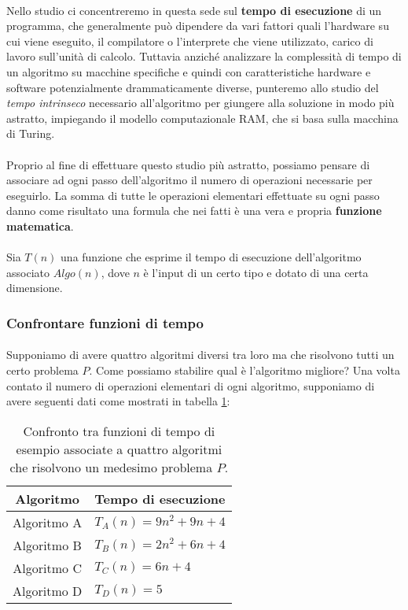 \documentclass[11pt,a4paper,oneside]{article}
\begin{document}
\paragraph*{} Nello studio ci concentreremo in questa sede sul \textbf{tempo di esecuzione} di un programma, che generalmente può dipendere da vari fattori quali l'hardware su cui viene eseguito, il compilatore o l'interprete che viene utilizzato, carico di lavoro sull'unità di calcolo. Tuttavia anziché analizzare la complessità di tempo di un algoritmo su macchine specifiche e quindi con caratteristiche hardware e software potenzialmente drammaticamente diverse, punteremo allo studio del \textit{tempo intrinseco} necessario all'algoritmo per giungere alla soluzione in modo più astratto, impiegando il modello computazionale RAM, che si basa sulla macchina di Turing.
\paragraph*{}Proprio al fine di effettuare questo studio più astratto, possiamo pensare di associare ad ogni passo dell'algoritmo il numero di operazioni necessarie per eseguirlo. La somma di tutte le operazioni elementari effettuate su ogni passo danno come risultato una formula che nei fatti è una vera e propria \textbf{funzione matematica}.
\paragraph*{}Sia $T(n)$ una funzione che esprime il tempo di esecuzione dell'algoritmo associato $Algo(n)$, dove $n$ è l'input di un certo tipo e dotato di una certa dimensione.
\subsubsection{Confrontare funzioni di tempo}
\paragraph*{}Supponiamo di avere quattro algoritmi diversi tra loro ma che risolvono tutti un certo problema $P$. Come possiamo stabilire qual è l'algoritmo migliore? Una volta contato il numero di operazioni elementari di ogni algoritmo, supponiamo di avere seguenti dati come mostrati in tabella \ref{tab:algos}:

\begin{table}[h]
	\centering
	\begin{tabular}{|c|l|}
		\hline
		\textbf{Algoritmo}&\textbf{Tempo di esecuzione}\\\hline 
		Algoritmo A &  $T_A(n) = 9n^2+9n+4$ \\ 
		Algoritmo B &  $T_B(n) = 2n^2+6n+4$\\ 
		Algoritmo C &  $T_C(n) = 6n+4$\\ 
		Algoritmo D &  $T_D(n) = 5$ \\ \hline
	\end{tabular}
	\caption{Confronto tra funzioni di tempo di esempio associate a quattro algoritmi che risolvono un medesimo problema $P$.}
	\label{tab:algos}
\end{table}
\end{document}
